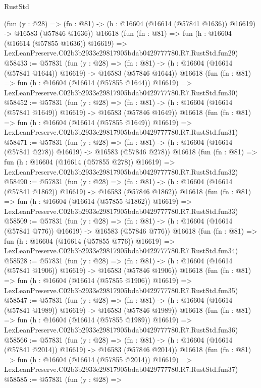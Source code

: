 \begin{lexlean}{RustStd}
\begin{coremodule}
    (fun (y : @28) =>
    (fn : @81) -> (h : @16604 (@16614 (@57841 @1636)) @16619) -> @16583 (@57846 @1636))
    @16618
    (fun (fn : @81) =>
    fun (h : @16604 (@16614 (@57855 @1636)) @16619) =>
    LexLeanPreserve.C02b3b2933e29817905bdab0429777780.R7.RustStd.fun29)
@58433 := @57831
    (fun (y : @28) =>
    (fn : @81) -> (h : @16604 (@16614 (@57841 @1644)) @16619) -> @16583 (@57846 @1644))
    @16618
    (fun (fn : @81) =>
    fun (h : @16604 (@16614 (@57855 @1644)) @16619) =>
    LexLeanPreserve.C02b3b2933e29817905bdab0429777780.R7.RustStd.fun30)
@58452 := @57831
    (fun (y : @28) =>
    (fn : @81) -> (h : @16604 (@16614 (@57841 @1649)) @16619) -> @16583 (@57846 @1649))
    @16618
    (fun (fn : @81) =>
    fun (h : @16604 (@16614 (@57855 @1649)) @16619) =>
    LexLeanPreserve.C02b3b2933e29817905bdab0429777780.R7.RustStd.fun31)
@58471 := @57831
    (fun (y : @28) =>
    (fn : @81) -> (h : @16604 (@16614 (@57841 @278)) @16619) -> @16583 (@57846 @278))
    @16618
    (fun (fn : @81) =>
    fun (h : @16604 (@16614 (@57855 @278)) @16619) =>
    LexLeanPreserve.C02b3b2933e29817905bdab0429777780.R7.RustStd.fun32)
@58490 := @57831
    (fun (y : @28) =>
    (fn : @81) -> (h : @16604 (@16614 (@57841 @1862)) @16619) -> @16583 (@57846 @1862))
    @16618
    (fun (fn : @81) =>
    fun (h : @16604 (@16614 (@57855 @1862)) @16619) =>
    LexLeanPreserve.C02b3b2933e29817905bdab0429777780.R7.RustStd.fun33)
@58509 := @57831
    (fun (y : @28) =>
    (fn : @81) -> (h : @16604 (@16614 (@57841 @776)) @16619) -> @16583 (@57846 @776))
    @16618
    (fun (fn : @81) =>
    fun (h : @16604 (@16614 (@57855 @776)) @16619) =>
    LexLeanPreserve.C02b3b2933e29817905bdab0429777780.R7.RustStd.fun34)
@58528 := @57831
    (fun (y : @28) =>
    (fn : @81) -> (h : @16604 (@16614 (@57841 @1906)) @16619) -> @16583 (@57846 @1906))
    @16618
    (fun (fn : @81) =>
    fun (h : @16604 (@16614 (@57855 @1906)) @16619) =>
    LexLeanPreserve.C02b3b2933e29817905bdab0429777780.R7.RustStd.fun35)
@58547 := @57831
    (fun (y : @28) =>
    (fn : @81) -> (h : @16604 (@16614 (@57841 @1989)) @16619) -> @16583 (@57846 @1989))
    @16618
    (fun (fn : @81) =>
    fun (h : @16604 (@16614 (@57855 @1989)) @16619) =>
    LexLeanPreserve.C02b3b2933e29817905bdab0429777780.R7.RustStd.fun36)
@58566 := @57831
    (fun (y : @28) =>
    (fn : @81) -> (h : @16604 (@16614 (@57841 @2014)) @16619) -> @16583 (@57846 @2014))
    @16618
    (fun (fn : @81) =>
    fun (h : @16604 (@16614 (@57855 @2014)) @16619) =>
    LexLeanPreserve.C02b3b2933e29817905bdab0429777780.R7.RustStd.fun37)
@58585 := @57831
    (fun (y : @28) =>

\end{coremodule}
\end{lexlean}
